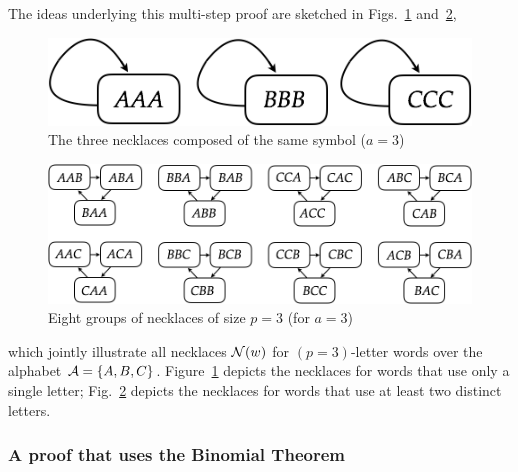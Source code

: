 The ideas underlying this multi-step proof are sketched in Figs.~\ref{fig:necklace3} and~\ref{fig:necklace24},
\begin{figure}[htb]
\begin{center}
        \includegraphics[scale=0.3]{FiguresArithmetic/Necklace3.png}
        \caption{The three necklaces composed of the same symbol ($a=3$)}
        \label{fig:necklace3}
\end{center}
\end{figure}
\begin{figure}[htb]
\begin{center}
        \includegraphics[scale=0.3]{FiguresArithmetic/Necklace24.png}
        \caption{Eight groups of necklaces of size $p=3$ (for $a=3$)}
        \label{fig:necklace24}
\end{center}
\end{figure}
which jointly illustrate all necklaces $\mbox{$\cal N$}(w)$ for $(p=3)$-letter words over the alphabet $\mbox{$\cal A$} = \{ A,B,C \}$.  Figure~\ref{fig:necklace3} depicts the necklaces for words that use only a single letter; Fig.~\ref{fig:necklace24} depicts the necklaces for words that use at least two distinct letters.

\subsubsection{A proof that uses the Binomial Theorem}
\label{sec:FTL-via-BinomialTheorem}

